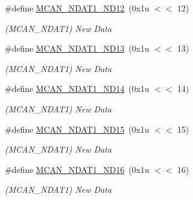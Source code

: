 \begin{DoxyCompactItemize}
\mbox{\label{group__SAMV71__MCAN_ga8c6f2a5e42849a2af3478525a36454aa}} 
\#define \mbox{\hyperlink{group__SAMV71__MCAN_ga8c6f2a5e42849a2af3478525a36454aa}{M\+C\+A\+N\+\_\+\+N\+D\+A\+T1\+\_\+\+N\+D12}}~(0x1u $<$$<$ 12)
\begin{DoxyCompactList}\small\item\em (M\+C\+A\+N\+\_\+\+N\+D\+A\+T1) New Data \end{DoxyCompactList}\item 
\mbox{\label{group__SAMV71__MCAN_ga6f01dad98a0daee59d3ed30b883aabdd}} 
\#define \mbox{\hyperlink{group__SAMV71__MCAN_ga6f01dad98a0daee59d3ed30b883aabdd}{M\+C\+A\+N\+\_\+\+N\+D\+A\+T1\+\_\+\+N\+D13}}~(0x1u $<$$<$ 13)
\begin{DoxyCompactList}\small\item\em (M\+C\+A\+N\+\_\+\+N\+D\+A\+T1) New Data \end{DoxyCompactList}\item 
\mbox{\label{group__SAMV71__MCAN_ga9480703236daff72f525a07a4b477bf9}} 
\#define \mbox{\hyperlink{group__SAMV71__MCAN_ga9480703236daff72f525a07a4b477bf9}{M\+C\+A\+N\+\_\+\+N\+D\+A\+T1\+\_\+\+N\+D14}}~(0x1u $<$$<$ 14)
\begin{DoxyCompactList}\small\item\em (M\+C\+A\+N\+\_\+\+N\+D\+A\+T1) New Data \end{DoxyCompactList}\item 
\mbox{\label{group__SAMV71__MCAN_ga542f9790bb3cf646a49028367c68c3a2}} 
\#define \mbox{\hyperlink{group__SAMV71__MCAN_ga542f9790bb3cf646a49028367c68c3a2}{M\+C\+A\+N\+\_\+\+N\+D\+A\+T1\+\_\+\+N\+D15}}~(0x1u $<$$<$ 15)
\begin{DoxyCompactList}\small\item\em (M\+C\+A\+N\+\_\+\+N\+D\+A\+T1) New Data \end{DoxyCompactList}\item 
\mbox{\label{group__SAMV71__MCAN_ga22f1da0d47584205fdd6b39385d12422}} 
\#define \mbox{\hyperlink{group__SAMV71__MCAN_ga22f1da0d47584205fdd6b39385d12422}{M\+C\+A\+N\+\_\+\+N\+D\+A\+T1\+\_\+\+N\+D16}}~(0x1u $<$$<$ 16)
\begin{DoxyCompactList}\small\item\em (M\+C\+A\+N\+\_\+\+N\+D\+A\+T1) New Data \end{DoxyCompactList}\item 
$$
\end{DoxyCompactItemize}
